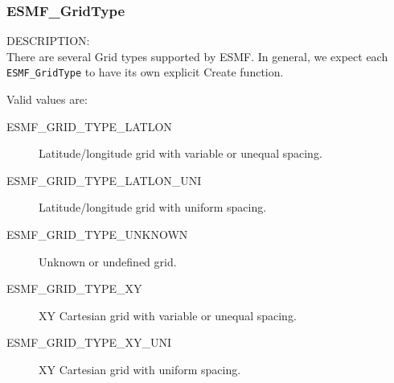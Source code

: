  \subsubsection{ESMF\_GridType}
 
 {\sf DESCRIPTION:\\}
 There are several Grid types supported by ESMF.  In general, we expect each
 {\tt ESMF\_GridType} to have its own explicit Create function.
 
 Valid values are:
 \begin{description}
    \item [ESMF\_GRID\_TYPE\_LATLON]
          Latitude/longitude grid with variable or unequal spacing.
 
    \item [ESMF\_GRID\_TYPE\_LATLON\_UNI]
          Latitude/longitude grid with uniform spacing.
 
    \item [ESMF\_GRID\_TYPE\_UNKNOWN]
          Unknown or undefined grid.

    \item [ESMF\_GRID\_TYPE\_XY]
          XY Cartesian grid with variable or unequal spacing.
 
    \item [ESMF\_GRID\_TYPE\_XY\_UNI]
          XY Cartesian grid with uniform spacing.
 
 \end{description}



